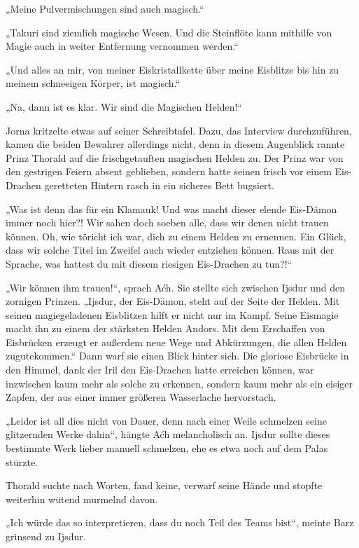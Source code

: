 „Meine Pulvermischungen sind auch magisch.“

„Takuri sind ziemlich magische Wesen. Und die Steinflöte kann mithilfe von Magie auch in weiter Entfernung vernommen werden.“

„Und alles an mir, von meiner Eiskristallkette über meine Eisblitze bis hin zu meinem schneeigen Körper, ist magisch.“

„Na, dann ist es klar. Wir sind die Magischen Helden!“

Jorna kritzelte etwas auf seiner Schreibtafel. Dazu, das Interview durchzuführen, kamen die beiden Bewahrer allerdings nicht, denn in diesem Augenblick rannte Prinz Thorald auf die frischgetauften magischen Helden zu. Der Prinz war von den gestrigen Feiern absent geblieben, sondern hatte seinen frisch vor einem Eis-Drachen geretteten Hintern rasch in ein sicheres Bett bugsiert.

„Was ist denn das für ein Klamauk! Und was macht dieser elende Eis-Dämon immer noch hier?! Wir sahen doch soeben alle, dass wir denen nicht trauen können. Oh, wie töricht ich war, dich zu einem Helden zu ernennen. Ein Glück, dass wir solche Titel im Zweifel auch wieder entziehen können. Raus mit der Sprache, was hattest du mit diesem riesigen Eis-Drachen zu tun?!“

„Wir können ihm trauen!“, sprach Aćh. Sie stellte sich zwischen Ijsdur und den zornigen Prinzen. „Ijsdur, der Eis-Dämon, steht auf der Seite der Helden. Mit seinen magiegeladenen Eisblitzen hilft er nicht nur im Kampf. Seine Eismagie macht ihn zu einem der stärksten Helden Andors. Mit dem Erschaffen von Eisbrücken erzeugt er außerdem neue Wege und Abkürzungen, die allen Helden zugutekommen.“ Dann warf sie einen Blick hinter sich. Die gloriose Eisbrücke in den Himmel, dank der Iril den Eis-Drachen hatte erreichen können, war inzwischen kaum mehr als solche zu erkennen, sondern kaum mehr als ein eisiger Zapfen, der aus einer immer größeren Wasserlache hervorstach.

„Leider ist all dies nicht von Dauer, denn nach einer Weile schmelzen seine glitzernden Werke dahin“, hängte Aćh melancholisch an. Ijsdur sollte dieses bestimmte Werk lieber manuell schmelzen, ehe es etwa noch auf dem Palas stürzte.

Thorald suchte nach Worten, fand keine, verwarf seine Hände und stopfte weiterhin wütend murmelnd davon.

„Ich würde das so interpretieren, dass du noch Teil des Teams bist“, meinte Barz grinsend zu Ijsdur.

